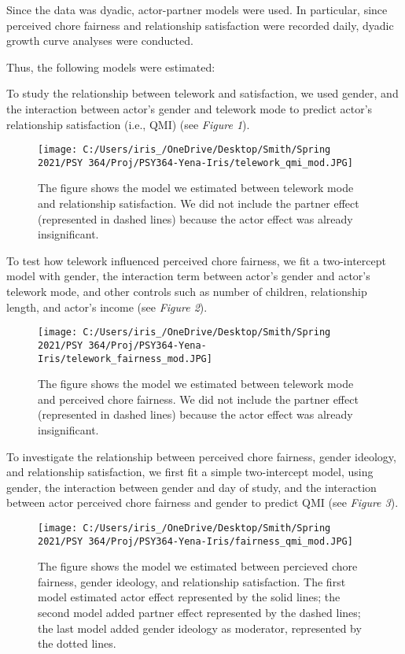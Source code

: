 \documentclass[
  english,
  man]{apa6}
\begin{document}
Since the data was dyadic, actor-partner models were used. In particular, since perceived chore fairness and relationship satisfaction were recorded daily, dyadic growth curve analyses were conducted.

Thus, the following models were estimated:

To study the relationship between telework and satisfaction, we used gender, and the interaction between actor's gender and telework mode to predict actor's relationship satisfaction (i.e., QMI) (see \emph{Figure 1}).

\begin{figure}
\centering
\texttt{[image: C:/Users/iris\_/OneDrive/Desktop/Smith/Spring 2021/PSY 364/Proj/PSY364-Yena-Iris/telework\_qmi\_mod.JPG]}
\caption{The figure shows the model we estimated between telework mode and relationship satisfaction. We did not include the partner effect (represented in dashed lines) because the actor effect was already insignificant.}
\end{figure}

To test how telework influenced perceived chore fairness, we fit a two-intercept model with gender, the interaction term between actor's gender and actor's telework mode, and other controls such as number of children, relationship length, and actor's income (see \emph{Figure 2}).

\begin{figure}
\centering
\texttt{[image: C:/Users/iris\_/OneDrive/Desktop/Smith/Spring 2021/PSY 364/Proj/PSY364-Yena-Iris/telework\_fairness\_mod.JPG]}
\caption{The figure shows the model we estimated between telework mode and perceived chore fairness. We did not include the partner effect (represented in dashed lines) because the actor effect was already insignificant.}
\end{figure}

To investigate the relationship between perceived chore fairness, gender ideology, and relationship satisfaction, we first fit a simple two-intercept model, using gender, the interaction between gender and day of study, and the interaction between actor perceived chore fairness and gender to predict QMI (see \emph{Figure 3}).

\begin{figure}
\centering
\texttt{[image: C:/Users/iris\_/OneDrive/Desktop/Smith/Spring 2021/PSY 364/Proj/PSY364-Yena-Iris/fairness\_qmi\_mod.JPG]}
\caption{The figure shows the model we estimated between percieved chore fairness, gender ideology, and relationship satisfaction. The first model estimated actor effect represented by the solid lines; the second model added partner effect represented by the dashed lines; the last model added gender ideology as moderator, represented by the dotted lines.}
\end{figure}
\end{document}

